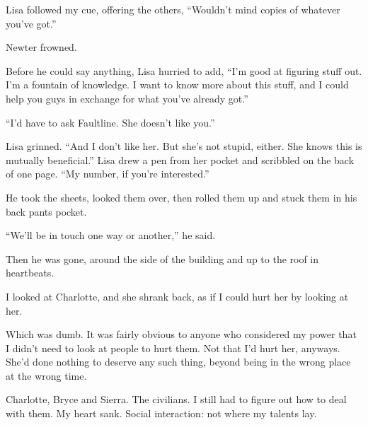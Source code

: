 Lisa followed my cue, offering the others, ``Wouldn't mind copies of whatever you've got.''



Newter frowned.



Before he could say anything, Lisa hurried to add, ``I'm good at figuring stuff out.  I'm a fountain of knowledge.  I want to know more about this stuff, and I could help you guys in exchange for what you've already got.''



``I'd have to ask Faultline.  She doesn't like you.''



Lisa grinned.  ``And I don't like her.  But she's not stupid, either.  She knows this is mutually beneficial.''  Lisa drew a pen from her pocket and scribbled on the back of one page.  ``My number, if you're interested.''



He took the sheets, looked them over, then rolled them up and stuck them in his back pants pocket.



``We'll be in touch one way or another,'' he said.



Then he was gone, around the side of the building and up to the roof in heartbeats.



I looked at Charlotte, and she shrank back, as if I could hurt her by looking at her.



Which was dumb.  It was fairly obvious to anyone who considered my power that I didn't need to look at people to hurt them.  Not that I'd hurt her, anyways.  She'd done nothing to deserve any such thing, beyond being in the wrong place at the wrong time.



Charlotte, Bryce and Sierra.  The civilians.  I still had to figure out how to deal with them.  My heart sank.  Social interaction: not where my talents lay.





